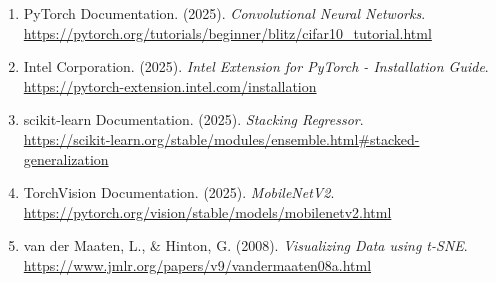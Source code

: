 \documentclass[a4paper, 12pt]{article}
\begin{document}
\begin{enumerate}
    \item PyTorch Documentation. (2025). \textit{Convolutional Neural Networks}. \\
    \url{https://pytorch.org/tutorials/beginner/blitz/cifar10_tutorial.html}
    
    \item Intel Corporation. (2025). \textit{Intel Extension for PyTorch - Installation Guide}. \\
    \url{https://pytorch-extension.intel.com/installation}
    
    \item scikit-learn Documentation. (2025). \textit{Stacking Regressor}. \\
    \url{https://scikit-learn.org/stable/modules/ensemble.html#stacked-generalization}
    
    \item TorchVision Documentation. (2025). \textit{MobileNetV2}. \\
    \url{https://pytorch.org/vision/stable/models/mobilenetv2.html}
    
    \item van der Maaten, L., \& Hinton, G. (2008). \textit{Visualizing Data using t-SNE}. \\
    \url{https://www.jmlr.org/papers/v9/vandermaaten08a.html}
\end{enumerate}
\end{document}
